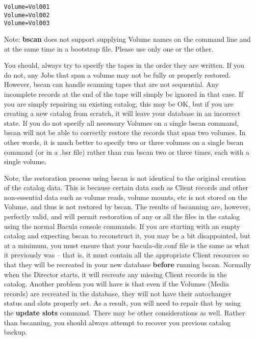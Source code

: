 \footnotesize
\begin{verbatim}
Volume=Vol001
Volume=Vol002
Volume=Vol003
\end{verbatim}
\normalsize

Note: {\bf bscan} does not support supplying Volume names on the
command line and at the same time in a bootstrap file.  Please
use only one or the other.

You should, always try to specify the tapes in the order they are written.
If you do not, any Jobs that span a volume may not be fully or properly
restored. However, bscan can handle scanning tapes that are not sequential.  Any
incomplete records at the end of the tape will simply be ignored in that
case.  If you are simply repairing an existing catalog, this may be OK, but
if you are creating a new catalog from scratch, it will leave your database
in an incorrect state.  If you do not specify all necessary Volumes on a
single bscan command, bscan will not be able to correctly restore the
records that span two volumes.  In other words, it is much better to
specify two or three volumes on a single bscan command (or in a .bsr file)
rather than run bscan two or three times, each with a single volume.

Note, the restoration process using bscan is not identical to the original
creation of the catalog data. This is because certain data such as Client
records and other non-essential data such
as volume reads, volume mounts, etc is not stored on the Volume, and thus is
not restored by bscan. The results of bscanning are, however, perfectly valid,
and will permit restoration of any or all the files in the catalog using the
normal Bacula console commands.  If you are starting with an empty catalog
and expecting bscan to reconstruct it, you may be a bit disappointed, but
at a minimum, you must ensure that your bacula-dir.conf file is the same
as what it previously was -- that is, it must contain all the appropriate
Client resources so that they will be recreated in your new database {\bf
before} running bscan. Normally when the Director starts, it will recreate
any missing Client records in the catalog.  Another problem you will have
is that even if the Volumes (Media records) are recreated in the database,
they will not have their autochanger status and slots properly set. As a
result, you will need to repair that by using the {\bf update slots}
command.  There may be other considerations as well.  Rather than
bscanning, you should always attempt to recover you previous catalog
backup.


